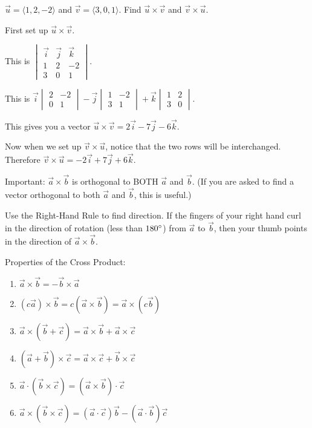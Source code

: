 \documentclass[../calc3.tex]{subfiles}
\begin{document}
\begin{example}
    $\vec{u}=\langle 1,2,-2\rangle$ and $\vec{v}=\langle 3,0,1\rangle$. Find $\vec{u}\times \vec{v}$ and $\vec{v}\times \vec{u}$.

    First set up $\vec{u}\times \vec{v}$.

    This is $\begin{vmatrix}
        \vec{i} & \vec{j} & \vec{k}\\
        1 & 2 & -2\\
        3 & 0 &1
    \end{vmatrix}$.

    This is $\vec{i}\begin{vmatrix}
        2 & -2\\ 0 & 1
    \end{vmatrix}-\vec{j}\begin{vmatrix}
        1 & -2\\
        3 & 1
    \end{vmatrix}+\vec{k}\begin{vmatrix}
        1 & 2\\
        3& 0
    \end{vmatrix}$.

    This gives you a vector $\vec{u}\times \vec{v}=2\vec{i}-7\vec{j}-6\vec{k}$.

    Now when we set up $\vec{v}\times \vec{u}$, notice that the two rows will be interchanged. Therefore $\vec{v}\times \vec{u}=-2\vec{i}+7\vec{j}+6\vec{k}$.
\end{example}

Important: $\vec{a}\times \vec{b}$ is orthogonal to BOTH $\vec{a}$ and $\vec{b}$. (If you are asked to find a vector orthogonal to both $\vec{a}$ and $\vec{b}$, this is useful.)

Use the Right-Hand Rule to find direction. If the fingers of your right hand curl in the direction of rotation (less than $180\degree$) from $\vec{a}$ to $\vec{b}$, then your thumb points in the direction of $\vec{a}\times \vec{b}$.

Properties of the Cross Product:
\begin{enumerate}
    \item $\vec{a}\times \vec{b}=-\vec{b}\times \vec{a}$
    \item $(c\vec{a})\times \vec{b}=c(\vec{a}\times \vec{b})=\vec{a}\times (c\vec{b})$
    \item $\vec{a}\times (\vec{b}+\vec{c})=\vec{a}\times \vec{b}+\vec{a}\times \vec{c}$
    \item $(\vec{a}+\vec{b})\times \vec{c}=\vec{a}\times \vec{c}+\vec{b}\times \vec{c}$
    \item $\vec{a}\cdot (\vec{b}\times \vec{c})=(\vec{a}\times \vec{b})\cdot \vec{c}$
    \item $\vec{a}\times (\vec{b}\times \vec{c})=(\vec{a}\cdot \vec{c})\vec{b}-(\vec{a}\cdot \vec{b})\vec{c}$
\end{enumerate}
\end{document}

